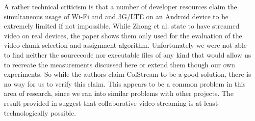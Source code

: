 A rather technical criticism is that a number of developer resources claim the simultaneous usage of Wi-Fi and and 3G/LTE on an Android device to be extremely limited if not impossible. While Zhong et al. state to have streamed video on real devices, the paper shows them only used for the evaluation of the video chunk selection and assignment algorithm. Unfortunately we were not able to find neither the sourcecode nor executable files of any kind that would allow us to recreate the measurements discussed here or extend them though our own experiments. So while the authors claim ColStream to be a good solution, there is no way for us to verify this claim. This appears to be a common problem in this area of research, since we ran into similar problems with other projects.
The result provided in \cite{ColStream} suggest that collaborative video streaming is at least technologically possible.

